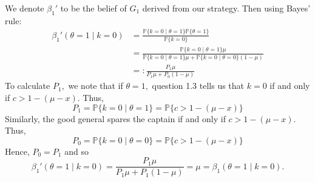 \documentclass[11pt]{article}
\newcommand{\bbP}{\mathbb{P}}
\begin{document}
\begin{solution}
    We denote $\beta_1'$ to be the belief  of $G_1$ derived from our strategy. Then using Bayes' rule:
    \begin{align*}
     \beta_1'(\theta = 1 \mid k = 0) &= \frac{\bbP\{k=0 \mid \theta = 1\}\bbP\{\theta = 1\}}{\bbP\{k=0\}}\\ &= \frac{\bbP\{k=0 \mid \theta = 1\}\mu}{\bbP\{k=0 \mid \theta = 1\}\mu + \bbP\{k=0 \mid \theta = 0\}(1-\mu)}\\& =: \frac{P_1 \mu}{P_1\mu + P_0(1-\mu)}    
    \end{align*}
    To calculate $P_1,$ we note that if $\theta = 1,$ question 1.3 tells us that $k= 0$ if and only if $c > 1- (\mu -x).$ Thus, 
    \[P_1 = \bbP\{k = 0 \mid \theta = 1\} = \bbP\{c> 1- (\mu - x)\}\] Similarly, the good general spares the captain if and only if $c > 1- (\mu - x).$ Thus,
    \[P_0 = \bbP\{k = 0 \mid \theta = 0\} = \bbP\{c > 1- (\mu - x)\}\] 
    Hence, $P_0 = P_1$ and so 
    \[\beta_1'(\theta = 1 \mid k = 0)= \frac{P_1 \mu}{P_1\mu  + P_1(1-\mu)}= \mu = \beta_1(\theta= 1 \mid k= 0).\]


\end{solution}
\end{document}
